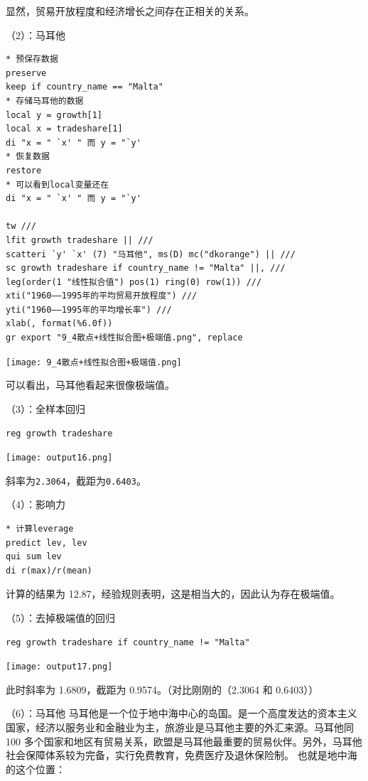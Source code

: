 \documentclass[cn,fancy,blue,11pt]{elegantbook}
\begin{document}
显然，贸易开放程度和经济增长之间存在正相关的关系。

（2）：马耳他

\begin{lstlisting}
* 预保存数据
preserve
keep if country_name == "Malta"
* 存储马耳他的数据
local y = growth[1]
local x = tradeshare[1]
di "x = " `x' " 而 y = "`y'
* 恢复数据
restore
* 可以看到local变量还在
di "x = " `x' " 而 y = "`y'

tw ///
lfit growth tradeshare || ///
scatteri `y' `x' (7) "马耳他", ms(D) mc("dkorange") || ///
sc growth tradeshare if country_name != "Malta" ||, ///
leg(order(1 "线性拟合值") pos(1) ring(0) row(1)) ///
xti("1960——1995年的平均贸易开放程度") ///
yti("1960——1995年的平均增长率") ///
xlab(, format(%6.0f))
gr export "9_4散点+线性拟合图+极端值.png", replace
\end{lstlisting}

\noindent\texttt{[image: 9\_4散点+线性拟合图+极端值.png]}

可以看出，马耳他看起来很像极端值。

（3）：全样本回归

\begin{lstlisting}
reg growth tradeshare
\end{lstlisting}

\noindent\texttt{[image: output16.png]}

斜率为\lstinline{2.3064}，截距为\lstinline{0.6403}。

（4）：影响力

\begin{lstlisting}
* 计算leverage
predict lev, lev
qui sum lev
di r(max)/r(mean)
\end{lstlisting}

计算的结果为 12.87，经验规则表明，这是相当大的，因此认为存在极端值。

（5）：去掉极端值的回归

\begin{lstlisting}
reg growth tradeshare if country_name != "Malta"
\end{lstlisting}

\noindent\texttt{[image: output17.png]}

此时斜率为 1.6809，截距为 0.9574。（对比刚刚的（2.3064 和 0.6403））

（6）：马耳他
马耳他是一个位于地中海中心的岛国。是一个高度发达的资本主义国家，经济以服务业和金融业为主，旅游业是马耳他主要的外汇来源。马耳他同 100 多个国家和地区有贸易关系，欧盟是马耳他最重要的贸易伙伴。另外，马耳他社会保障体系较为完备，实行免费教育，免费医疗及退休保险制。
也就是地中海的这个位置：
\end{document}

